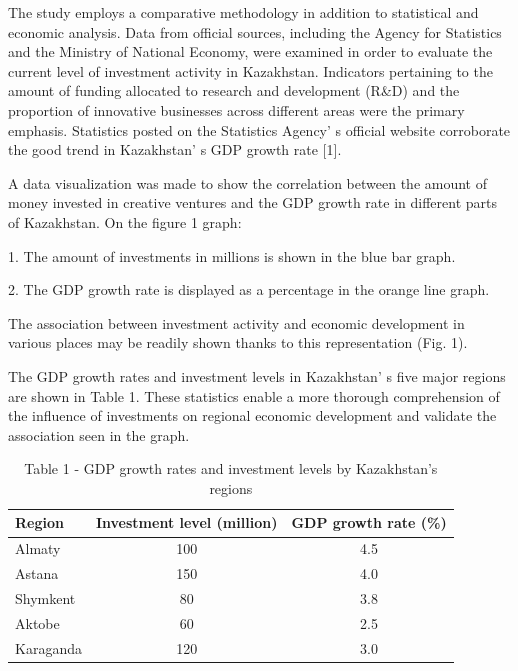 \begin{multicols}{2}
The study employs a comparative methodology in addition to statistical
and economic analysis. Data from official sources, including the Agency
for Statistics and the Ministry of National Economy, were examined in
order to evaluate the current level of investment activity in
Kazakhstan. Indicators pertaining to the amount of funding allocated to
research and development (R\&D) and the proportion of innovative
businesses across different areas were the primary emphasis. Statistics
posted on the Statistics Agency' s official website
corroborate the good trend in Kazakhstan' s GDP growth
rate {[}1{]}.

A data visualization was made to show the correlation between the amount
of money invested in creative ventures and the GDP growth rate in
different parts of Kazakhstan. On the figure 1 graph:

1. The amount of investments in millions is shown in the blue bar graph.

2. The GDP growth rate is displayed as a percentage in the orange line
graph.

The association between investment activity and economic development in
various places may be readily shown thanks to this representation (Fig.
1).

The GDP growth rates and investment levels in
Kazakhstan' s five major regions are shown in Table 1.
These statistics enable a more thorough comprehension of the influence
of investments on regional economic development and validate the
association seen in the graph.
\end{multicols}

\begin{table}[H]
\caption*{Table 1 - GDP growth rates and investment levels by Kazakhstan's regions}
\centering
\begin{tabular}{|l|c|c|}
\hline
Region & \multicolumn{1}{l|}{Investment level (million)} & \multicolumn{1}{l|}{GDP growth rate (\%)} \\ \hline
Almaty    & 100 & 4.5 \\ \hline
Astana    & 150 & 4.0 \\ \hline
Shymkent  & 80  & 3.8 \\ \hline
Aktobe    & 60  & 2.5 \\ \hline
Karaganda & 120 & 3.0 \\ \hline
\end{tabular}
\end{table}


